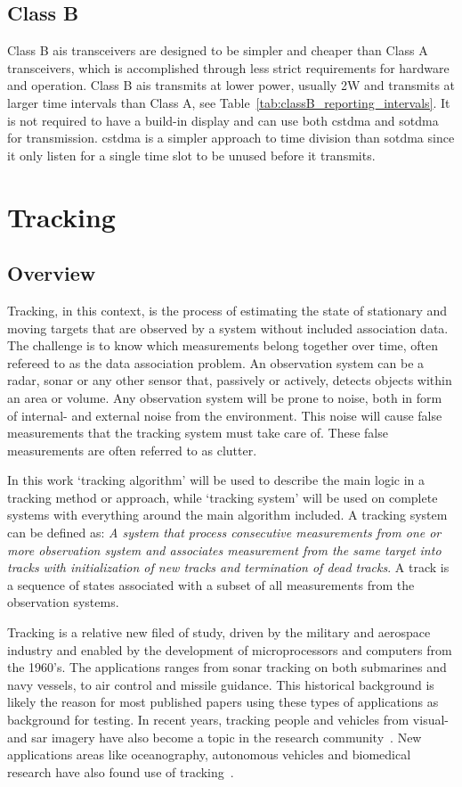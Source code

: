 \subsection{Class B}
Class B \gls{ais} transceivers are designed to be simpler and cheaper than Class A transceivers, which is accomplished through less strict requirements for hardware and operation. Class B \gls{ais} transmits at lower power, usually 2W and transmits at larger time intervals than Class A, see Table~\ref{tab:classB_reporting_intervals}. It is not required to have a build-in display and can use both \gls{cstdma} and \gls{sotdma} for transmission. \gls{cstdma} is a simpler approach to time division than \gls{sotdma} since it only listen for a single time slot to be unused before it transmits.

\section{Tracking}
\subsection{Overview}
Tracking, in this context, is the process of estimating the state of stationary and moving targets that are observed by a system without included association data. The challenge is to know which measurements belong together over time, often refereed to as the data association problem. An observation system can be a radar, sonar or any other sensor that, passively or actively, detects objects within an area or volume. Any observation system will be prone to noise, both in form of internal- and external noise from the environment. This noise will cause false measurements that the tracking system must take care of. These false measurements are often referred to as clutter.

In this work `tracking algorithm' will be used to describe the main logic in a tracking method or approach, while `tracking system' will be used on complete systems with everything around the main algorithm included. A tracking system can be defined as: \emph{A system that process consecutive measurements from one or more observation system and associates measurement from the same target into tracks with initialization of new tracks and termination of dead tracks}. A track is a sequence of states associated with a subset of all measurements from the observation systems. 

Tracking is a relative new filed of study, driven by the military and aerospace industry and enabled by the development of microprocessors and computers from the 1960's. The applications ranges from sonar tracking on both submarines and navy vessels, to air control and missile guidance. This historical background is likely the reason for most published papers using these types of applications as background for testing. In recent years, tracking people and vehicles from visual- and \gls{sar} imagery have also become a topic in the research community~\cite{Carthel2007,Carthel2007a,Coraluppi2000}. New applications areas like oceanography, autonomous vehicles and biomedical research have also found use of tracking~\cite{Wolf2010,Svec2014,Vo2015}.

